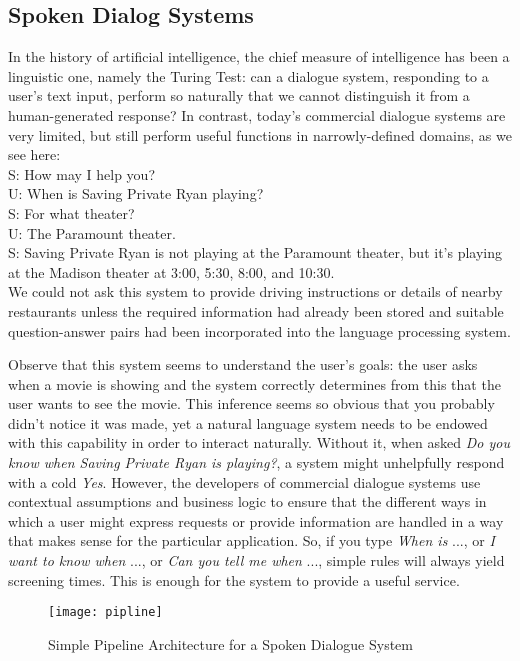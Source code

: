 \subsection{Spoken Dialog Systems}
In the history of artificial intelligence, the chief measure of intelligence has been a linguistic one, namely the Turing Test: can a dialogue system, responding to a user's text input, perform so naturally that we cannot distinguish it from a human-generated response? In contrast, today's commercial dialogue systems are very limited, but still perform useful functions in narrowly-defined domains, as we see here:\\
S: How may I help you?\\
U: When is Saving Private Ryan playing?\\
S: For what theater?\\
U: The Paramount theater.\\
S: Saving Private Ryan is not playing at the Paramount theater, but
it's playing at the Madison theater at 3:00, 5:30, 8:00, and 10:30.\\

We could not ask this system to provide driving instructions or details of nearby restaurants unless the required information had already been stored and suitable question-answer pairs had been incorporated into the language processing system.

Observe that this system seems to understand the user's goals: the user asks when a movie is showing and the system correctly determines from this that the user wants to see the movie. This inference seems so obvious that you probably didn't notice it was made, yet a natural language system needs to be endowed with this capability in order to interact naturally. Without it, when asked \emph{Do you know when Saving Private Ryan is playing?}, a system might unhelpfully respond with a cold \emph{Yes}. However, the developers of commercial dialogue systems use contextual assumptions and business logic to ensure that the different ways in which a user might express requests or provide information are handled in a way that makes sense for the particular application. So, if you type \emph{When is} ..., or \emph{I want to know when} ..., or \emph{Can you tell me when} ..., simple rules will always yield screening times. This is enough for the system to provide a useful service.


\begin{figure}
    \centering
    \texttt{[image: pipline]}
    \caption{Simple Pipeline Architecture for a Spoken Dialogue System\cite{NLPbook}}
    \label{fig:1}
\end{figure}

